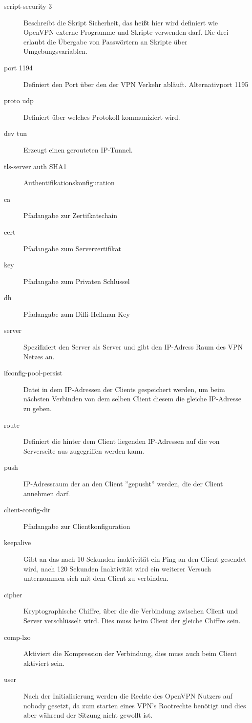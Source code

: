 \begin{description}
	\item[script-security 3]
	Beschreibt die Skript Sicherheit, das heißt hier wird definiert wie OpenVPN externe Programme und Skripte verwenden darf. Die drei  erlaubt die Übergabe von Passwörtern an Skripte über Umgebungsvariablen.
	\item[port 1194] Definiert den Port über den der VPN Verkehr abläuft. Alternativport 1195
	\item[proto udp] Definiert über welches Protokoll kommuniziert wird. 
	\item[dev tun] Erzeugt einen gerouteten IP-Tunnel.
	\item[tls-server auth SHA1] Authentifikationskonfiguration
	\item[ca] Pfadangabe zur Zertifkatschain
	\item[cert] Pfadangabe zum Serverzertifikat 
	\item[key] Pfadangabe zum Privaten Schlüssel
	\item[dh] Pfadangabe zum Diffi-Hellman Key 
	\item[server] Spezifiziert den Server als Server und gibt den IP-Adress Raum des VPN Netzes an.	
	\item[ifconfig-pool-persist] Datei in dem IP-Adressen der Clients gespeichert werden, um beim nächsten Verbinden von dem selben Client diesem die gleiche IP-Adresse zu geben. 
	\item[route] Definiert die hinter dem Client liegenden IP-Adressen auf die von Serverseite aus zugegriffen werden kann.
	\item[push] IP-Adressraum der an den Client ''gepusht'' werden, die der Client annehmen darf. 
	\item[client-config-dir] Pfadangabe zur Clientkonfiguration
	\item[keepalive] Gibt an das nach 10 Sekunden inaktivität ein Ping an den Client gesendet wird, nach 120 Sekunden Inaktivität wird ein weiterer Versuch unternommen sich mit dem Client zu verbinden.
	\item[cipher] Kryptographische Chiffre, über die die Verbindung zwischen Client und Server verschlüsselt wird. Dies muss beim Client der gleiche Chiffre sein.
	\item[comp-lzo] Aktiviert die Kompression der Verbindung, dies muss auch beim Client aktiviert sein.
	\item[user] Nach der Initialisierung werden die Rechte des OpenVPN Nutzers auf nobody gesetzt, da zum starten eines VPN's Rootrechte benötigt und dies aber während der Sitzung nicht gewollt ist.

\end{description}
